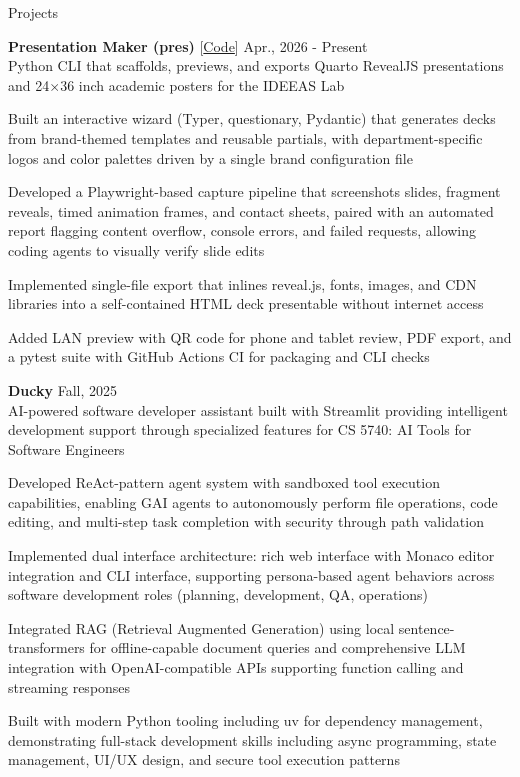 \documentclass{resume}
\begin{document}
\begin{rSection}{Projects}

{\bf Presentation Maker (pres)}{\hspace{2em} [\href{https://github.com/mitchg10/pres}{Code}]} \hfill {Apr., 2026 - Present} \\
Python CLI that scaffolds, previews, and exports Quarto RevealJS presentations and 24$\times$36 inch academic posters for the IDEEAS Lab
\begin{cvitems}
    \item Built an interactive wizard (Typer, questionary, Pydantic) that generates decks from brand-themed templates and reusable partials, with department-specific logos and color palettes driven by a single brand configuration file
    \item Developed a Playwright-based capture pipeline that screenshots slides, fragment reveals, timed animation frames, and contact sheets, paired with an automated report flagging content overflow, console errors, and failed requests, allowing coding agents to visually verify slide edits
    \item Implemented single-file export that inlines reveal.js, fonts, images, and CDN libraries into a self-contained HTML deck presentable without internet access
    \item Added LAN preview with QR code for phone and tablet review, PDF export, and a pytest suite with GitHub Actions CI for packaging and CLI checks
\end{cvitems}

{\bf Ducky}{\hspace{2em}} \hfill {Fall, 2025} \\
AI-powered software developer assistant built with Streamlit providing intelligent development support through specialized features for CS 5740: AI Tools for Software Engineers
\begin{cvitems}
    \item Developed ReAct-pattern agent system with sandboxed tool execution capabilities, enabling GAI agents to autonomously perform file operations, code editing, and multi-step task completion with security through path validation
    \item Implemented dual interface architecture: rich web interface with Monaco editor integration and CLI interface, supporting persona-based agent behaviors across software development roles (planning, development, QA, operations)
    \item Integrated RAG (Retrieval Augmented Generation) using local sentence-transformers for offline-capable document queries and comprehensive LLM integration with OpenAI-compatible APIs supporting function calling and streaming responses
    \item Built with modern Python tooling including uv for dependency management, demonstrating full-stack development skills including async programming, state management, UI/UX design, and secure tool execution patterns
\end{cvitems}


\end{rSection}
\end{document}
